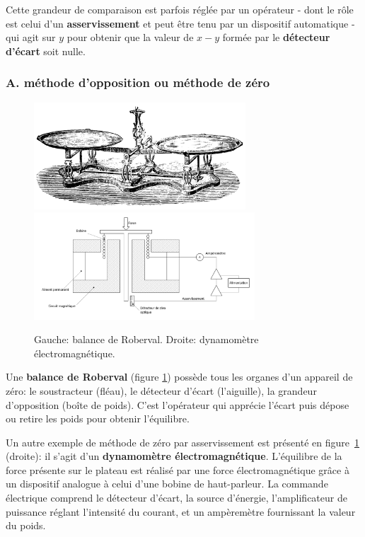 Cette grandeur de comparaison est parfois réglée par un opérateur - dont le rôle est celui d'un \textbf{asservissement} et peut être tenu par un dispositif automatique - qui agit sur $y$ pour obtenir que la valeur de $x-y$ formée par le \textbf{détecteur d'écart} soit nulle.

\subsubsection{A. méthode d'opposition ou méthode de zéro}

\begin{figure}[h]
    \centering
    \includegraphics[height=4cm]{assets/figures/balande-roberval.pdf}\hspace{5mm}
    \includegraphics[height=4cm]{assets/figures/dynamo.pdf}
    \caption{Gauche: balance de Roberval. Droite: dynamomètre électromagnétique.}
    \label{fig:balance}
\end{figure}
Une \textbf{balance de Roberval} (figure \ref{fig:balance}) possède tous les organes d'un appareil de zéro: le soustracteur (fléau), le détecteur d'écart (l'aiguille), la grandeur d'opposition (boîte de poids). C'est l'opérateur qui apprécie l'écart puis dépose ou retire les poids pour obtenir l'équilibre.

Un autre exemple de méthode de zéro par asservissement est présenté en figure~\ref{fig:balance} (droite): il s'agit d'un \textbf{dynamomètre électromagnétique}. L'équilibre de la force présente sur le plateau est réalisé par une force électromagnétique grâce à un dispositif analogue à celui d'une bobine de haut-parleur. La commande électrique comprend le détecteur d'écart, la source d'énergie, l'amplificateur de puissance réglant l'intensité du courant, et un ampèremètre fournissant la valeur du poids.

